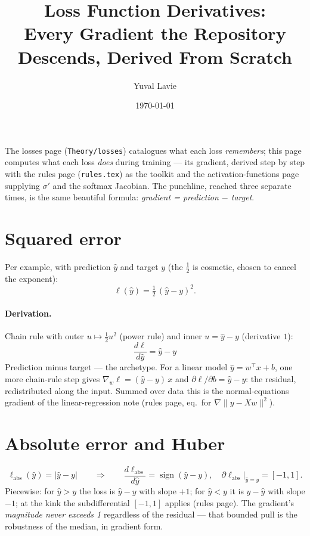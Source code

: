 \documentclass[11pt]{article}
\title{Loss Function Derivatives:\\
Every Gradient the Repository Descends, Derived From Scratch}
\author{Yuval Lavie}
\date{\today}
\begin{document}
\maketitle

\noindent
The losses page (\texttt{Theory/losses}) catalogues what each loss
\emph{remembers}; this page computes what each loss \emph{does} during
training --- its gradient, derived step by step with the rules page
(\texttt{rules.tex}) as the toolkit and the activation-functions page
supplying $\sigma'$ and the softmax Jacobian. The punchline, reached
three separate times, is the same beautiful formula:
\emph{gradient = prediction $-$ target}.

\section{Squared error}

Per example, with prediction $\hat y$ and target $y$ (the $\tfrac12$ is
cosmetic, chosen to cancel the exponent):
\begin{equation}
  \ell(\hat y) = \tfrac{1}{2}\,(\hat y - y)^{2}.
  \label{eq:mse}
\end{equation}

\paragraph{Derivation.} Chain rule with outer $u \mapsto \tfrac12 u^2$
(power rule) and inner $u = \hat y - y$ (derivative $1$):
\begin{equation}
  \boxed{\;\frac{d\ell}{d\hat y} = \hat y - y\;}
  \label{eq:mseprime}
\end{equation}
Prediction minus target --- the archetype. For a linear model
$\hat y = w^{\top}x + b$, one more chain-rule step gives
$\nabla_w \ell = (\hat y - y)\,x$ and
$\partial \ell/\partial b = \hat y - y$: the residual, redistributed
along the input. Summed over data this is the normal-equations gradient
of the linear-regression note (rules page, eq.\ for
$\nabla \lVert y - Xw \rVert^2$).

\section{Absolute error and Huber}

\begin{equation}
  \ell_{\mathrm{abs}}(\hat y) = |\hat y - y|
  \qquad\Longrightarrow\qquad
  \frac{d\ell_{\mathrm{abs}}}{d\hat y}
  = \operatorname{sign}(\hat y - y),
  \quad
  \partial \ell_{\mathrm{abs}}\big|_{\hat y = y} = [-1, 1].
  \label{eq:maeprime}
\end{equation}
Piecewise: for $\hat y > y$ the loss is $\hat y - y$ with slope $+1$;
for $\hat y < y$ it is $y - \hat y$ with slope $-1$; at the kink the
subdifferential $[-1,1]$ applies (rules page). The gradient's
\emph{magnitude never exceeds 1} regardless of the residual --- that
bounded pull is the robustness of the median, in gradient form.
\end{document}

